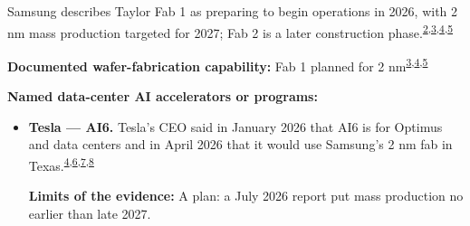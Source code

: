 \begin{minipage}[t][0.90\textheight][t]{\textwidth}
\begin{minipage}[t]{\textwidth}
\begin{minipage}[t]{0.32\textwidth}
\medskip
{\footnotesize Samsung describes Taylor Fab 1 as preparing to begin operations in 2026, with 2 nm mass production targeted for 2027; Fab 2 is a later construction phase.\nobreak\textsuperscript{\href{\detokenize{https://semiconductor.samsung.com/sas/company/taylor/}}{\textcolor{accent}{2}},\href{\detokenize{https://irsvc.teletogether.com/sec/pdf/2026Q1_script_eng.pdf?1=}}{\textcolor{accent}{3}},\href{\detokenize{https://irsvc.teletogether.com/sec/pdf/2026Q2_script_eng.pdf?1=}}{\textcolor{accent}{4}},\href{\detokenize{https://image.semiconductor.samsung.com/content/samsung/p6/semiconductor-us/sas/chips-and-science-act_240416/samsung-factsheet-chips-final.pdf}}{\textcolor{accent}{5}}}\par}
\medskip
{\footnotesize\textbf{Documented wafer-fabrication capability:} Fab 1 planned for 2 nm\nobreak\textsuperscript{\href{\detokenize{https://irsvc.teletogether.com/sec/pdf/2026Q1_script_eng.pdf?1=}}{\textcolor{accent}{3}},\href{\detokenize{https://irsvc.teletogether.com/sec/pdf/2026Q2_script_eng.pdf?1=}}{\textcolor{accent}{4}},\href{\detokenize{https://image.semiconductor.samsung.com/content/samsung/p6/semiconductor-us/sas/chips-and-science-act_240416/samsung-factsheet-chips-final.pdf}}{\textcolor{accent}{5}}}\par}
\end{minipage}
\end{minipage}
\par\vspace{0.65em}
\medskip
{\footnotesize\textbf{Named data-center AI accelerators or programs:}\par}
\begin{itemize}[leftmargin=1.25em,itemsep=0.35em,topsep=0.15em,parsep=0pt]
\item {\footnotesize\textbf{Tesla --- AI6.} Tesla's CEO said in January 2026 that AI6 is for Optimus and data centers and in April 2026 that it would use Samsung's 2 nm fab in Texas.\nobreak\textsuperscript{\href{\detokenize{https://irsvc.teletogether.com/sec/pdf/2026Q2_script_eng.pdf?1=}}{\textcolor{accent}{4}},\href{\detokenize{https://www.koreajoongangdaily.com/business/musk-confirms-samsung-tsmc-to-produce-future-ai6-chips/12606378}}{\textcolor{accent}{6}},\href{\detokenize{https://electrek.co/2026/07/13/samsung-taylor-fab-tesla-ai5-chip-2nm/}}{\textcolor{accent}{7}},\href{\detokenize{https://www.notateslaapp.com/news/3515/musk-targets-9-month-chip-cycle-for-tesla-talks-ai5-ai6-and-space-based-ai}}{\textcolor{accent}{8}}}\par {\scriptsize\color{black!62}\textbf{Limits of the evidence:} A plan: a July 2026 report put mass production no earlier than late 2027.\par}}

\end{itemize}
\end{minipage}
